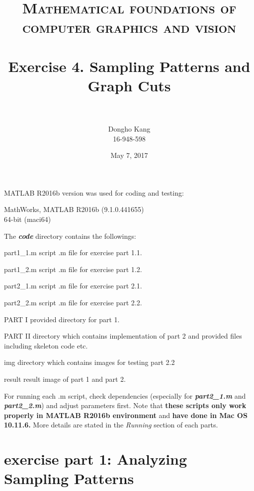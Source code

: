 \documentclass[paper=a4, fontsize=11pt]{scrartcl} %
\title{	
\normalfont \normalsize 
\textsc{Mathematical foundations of computer graphics and vision} \\ [25pt] %
\horrule{0.5pt} \\[0.4cm] %
\huge Exercise 4. Sampling Patterns and Graph Cuts\\ %
\horrule{2pt} \\[0.5cm] %
}
\author{Dongho Kang \\ \small 16-948-598} %
\date{\normalsize May 7, 2017} %
\numberwithin{equation}{section} %
\numberwithin{figure}{section} %
\numberwithin{table}{section} %
\newcommand{\filename}[1]{\textbf{\textit{#1}}}
\begin{document}
\maketitle %


MATLAB R2016b version was used for coding and testing:

\begin{center}
MathWorks, MATLAB R2016b (9.1.0.441655) \\
64-bit (maci64) 
\end{center}

The \filename{code} directory contains the followings:

\begin{filedescription}
	\item [part1\_1.m] script .m file for exercise part 1.1.
	\item [part1\_2.m] script .m file for exercise part 1.2.
	\item [part2\_1.m] script .m file for exercise part 2.1. 
	\item [part2\_2.m] script .m file for exercise part 2.2. 
	\item [PART I] provided directory for part 1.
	\item [PART II] directory which contains implementation of part 2 and provided files including skeleton code etc.
	\item [img] directory which contains images for testing part 2.2   
	\item [result] result image of part 1 and part 2.
\end{filedescription}

For running each .m script, check dependencies (especially for \filename{part2\_1.m} and \filename{part2\_2.m}) and adjust parameters first. Note that \textbf{these scripts only work properly in MATLAB R2016b environment} and \textbf{have done in Mac OS 10.11.6.} More details are stated in the \textit{Running} section of each parts.


\section{exercise part 1: Analyzing Sampling Patterns}
\end{document}
